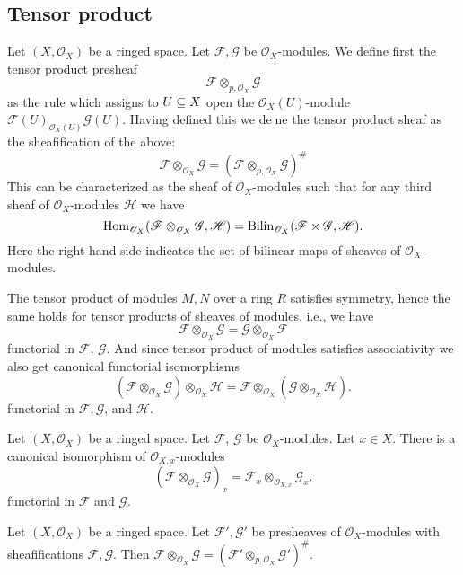 \subsection{Tensor product}
Let $(X,\mathscr{O}_X)$ be a ringed space. Let $\mathscr{F},\mathscr{G}$ be $\mathscr{O}_X$-modules. We define first the tensor product presheaf
\[\mathscr{F}\otimes_{p,\mathscr{O}_X}\mathscr{G}\]
as the rule which assigns to $U\subseteq X$ open the $\mathscr{O}_X(U)$-module $\mathscr{F}(U)_{\mathscr{O}_X(U)}\mathscr{G}(U)$. Having defined this we dene the tensor product sheaf as the sheafification of the above:
\[\mathscr{F}\otimes_{\mathscr{O}_X}\mathscr{G}=(\mathscr{F}\otimes_{p,\mathscr{O}_X}\mathscr{G})^{\#}\]
This can be characterized as the sheaf of $\mathscr{O}_X$-modules such that for any third sheaf of $\mathscr{O}_X$-modules $\mathscr{H}$ we have
\[\mathrm{Hom}_{\mathscr{O}_X}(\mathscr{F}\otimes_{\mathscr{O}_X}\mathscr{G},\mathscr{H})=\mathrm{Bilin}_{\mathscr{O}_X}(\mathscr{F}\times\mathscr{G},\mathscr{H}).\]
Here the right hand side indicates the set of bilinear maps of sheaves of $\mathscr{O}_X$-modules.\par
The tensor product of modules $M,N$ over a ring $R$ satisfies symmetry, hence the same holds for tensor products of sheaves of modules, i.e., we have
\[\mathscr{F}\otimes_{\mathscr{O}_X}\mathscr{G}=\mathscr{G}\otimes_{\mathscr{O}_X}\mathscr{F}\]
functorial in $\mathscr{F}$, $\mathscr{G}$. And since tensor product of modules satisfies associativity we also get canonical functorial isomorphisms
\[(\mathscr{F}\otimes_{\mathscr{O}_X}\mathscr{G})\otimes_{\mathscr{O}_X}\mathscr{H}=\mathscr{F}\otimes_{\mathscr{O}_X}(\mathscr{G}\otimes_{\mathscr{O}_X}\mathscr{H}).\]
functorial in $\mathscr{F},\mathscr{G}$, and $\mathscr{H}$.
\begin{proposition}
Let $(X,\mathscr{O}_X)$ be a ringed space. Let $\mathscr{F}$, $\mathscr{G}$ be $\mathscr{O}_X$-modules. Let $x\in X$. There is a canonical isomorphism of $\mathscr{O}_{X,x}$-modules
\[(\mathscr{F}\otimes_{\mathscr{O}_{X}}\mathscr{G})_x=\mathscr{F}_x\otimes_{\mathscr{O}_{X,x}}\mathscr{G}_x.\]
functorial in $\mathscr{F}$ and $\mathscr{G}$.
\end{proposition}
\begin{proposition}
Let $(X,\mathscr{O}_X)$ be a ringed space. Let $\mathscr{F}',\mathscr{G}'$ be presheaves of $\mathscr{O}_X$-modules with sheafifications $\mathscr{F},\mathscr{G}$. Then $\mathscr{F}\otimes_{\mathscr{O}_{X}}\mathscr{G}=(\mathscr{F}'\otimes_{p,\mathscr{O}_{X}}\mathscr{G}')^{\#}$.
\end{proposition}
